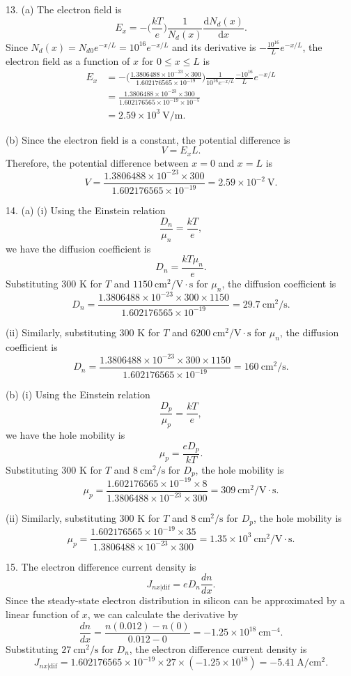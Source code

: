 \documentclass[a4paper]{article}
\begin{document}
13. (a) The electron field is
$$E_x=-\Big(\frac{kT}{e}\Big)\frac{1}{N_d(x)}\frac{\mathrm{d}N_d(x)}{\mathrm{d}x}.$$
Since $N_d(x)=N_{d0}e^{-x/L}=10^{16}e^{-x/L}$ and its derivative is $-\frac{10^{16}}{L}e^{-x/L}$, the electron field as a function of $x$ for $0\leq x\leq L$ is
\[
    \begin{aligned}
        E_x&=-\Big(\frac{1.3806488\times10^{-23}\times300}{1.602176565\times10^{-19}}\Big)\frac{1}{10^{16}e^{-x/L}}\frac{-10^{16}}{L}e^{-x/L}\\
        &=\frac{1.3806488\times10^{-23}\times300}{1.602176565\times10^{-19}\times10^{-5}}\\
        &=2.59\times10^{3}\ \text{V/m}.
    \end{aligned}
\]

(b) Since the electron field is a constant, the potential difference is
$$V=E_xL.$$
Therefore, the potential difference between $x=0$ and $x=L$ is
$$V=\frac{1.3806488\times10^{-23}\times300}{1.602176565\times10^{-19}}=2.59\times10^{-2}\ \text{V}.$$

14. (a) (i) Using the Einstein relation
$$\frac{D_n}{\mu_n}=\frac{kT}{e},$$
we have the diffusion coefficient is
$$D_n=\frac{kT\mu_n}{e}.$$
Substituting 300 K for $T$ and $1150\ \mathrm{cm}^2/\mathrm{V\cdot s}$ for $\mu_n$, the diffusion coefficient is
$$D_n=\frac{1.3806488\times10^{-23}\times300\times1150}{1.602176565\times10^{-19}}=29.7\ \mathrm{{cm}^2/s}.$$

(ii) Similarly, substituting 300 K for $T$ and $6200\ \mathrm{cm}^2/\mathrm{V\cdot s}$ for $\mu_n$, the diffusion coefficient is
$$D_n=\frac{1.3806488\times10^{-23}\times300\times1150}{1.602176565\times10^{-19}}=160\ \mathrm{{cm}^2/s}.$$

(b) (i) Using the Einstein relation
$$\frac{D_p}{\mu_p}=\frac{kT}{e},$$
we have the hole mobility is
$$\mu_p=\frac{eD_p}{kT}.$$
Substituting 300 K for $T$ and $8\ \mathrm{cm}^2/\mathrm{s}$ for $D_p$, the hole mobility is
$$\mu_p=\frac{1.602176565\times10^{-19}\times8}{1.3806488\times10^{-23}\times300}=309\ \mathrm{{cm}^2/V\cdot s}.$$

(ii) Similarly, substituting 300 K for $T$ and $8\ \mathrm{cm}^2/\mathrm{s}$ for $D_p$, the hole mobility is
$$\mu_p=\frac{1.602176565\times10^{-19}\times35}{1.3806488\times10^{-23}\times300}=1.35\times10^{3}\ \mathrm{{cm}^2/V\cdot s}.$$

15. The electron difference current density is
$$J_{nx|\text{dif}}=eD_n\frac{dn}{dx}.$$
Since the steady-state electron distribution in silicon can be approximated by a linear function of $x$, we can calculate the derivative by
$$\frac{dn}{dx}=\frac{n(0.012)-n(0)}{0.012-0}=-1.25\times10^{18}\ \text{cm}^{-4}.$$
Substituting $27\ \mathrm{{cm}^2/s}$ for $D_n$, the electron difference current density is
$$J_{nx|\text{dif}}=1.602176565\times10^{-19}\times27\times(-1.25\times10^{18})=-5.41\ \mathrm{A/{cm}^2}.$$
\end{document}
